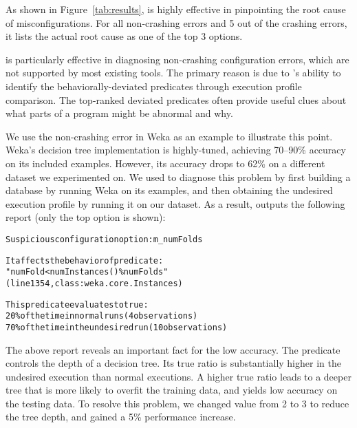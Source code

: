 

As shown in Figure~\ref{tab:results},
\ourtool is highly effective in pinpointing the root cause of
misconfigurations. For all \noncrash non-crashing errors
and 5 out of the \crash crashing errors, it lists the actual root cause as one of the top 3 options. 


\ourtool is particularly effective in diagnosing non-crashing configuration errors,
which are not supported by most existing tools. The primary reason is due to
\ourtool's ability to identify the behaviorally-deviated predicates through
execution profile comparison. The top-ranked deviated predicates often provide
useful clues about what parts of a program might be abnormal and why.

We use the non-crashing error in Weka as an example to illustrate
this point. 
Weka's decision tree implementation is highly-tuned, achieving 70--90\% accuracy on
its included examples. However, its accuracy drops to 62\%
on a different dataset we experimented on. We used \ourtool to diagnose this
problem by first building a database by running Weka on its examples, and
then
obtaining the undesired execution profile by running it on our dataset. As a result,
\ourtool outputs the following report (only the top option is shown):

\vspace{-1mm}

\begin{CodeOut}
\begin{alltt} 
  Suspicious configuration option: m\_numFolds

  It affects the behavior of predicate:
  "numFold < numInstances() \% numFolds"
  (line 1354, class: weka.core.Instances) 

  This predicate evaluates to true:
    20\% of the time in normal runs (4 observations)
    70\% of the time in the undesired run (10 observations)

\end{alltt}
\end{CodeOut}

\vspace{-4mm}

The above report reveals an important fact for the low accuracy.
The predicate  controls
the depth of a decision tree. Its
true ratio is substantially higher in the undesired execution
than normal executions. A higher true ratio leads
to a deeper tree that is more likely to overfit the training
data, and yields low accuracy on the testing data.
To resolve this problem, we changed 
value from 2 to 3 to reduce the tree depth, and
gained a 5\% performance increase.

